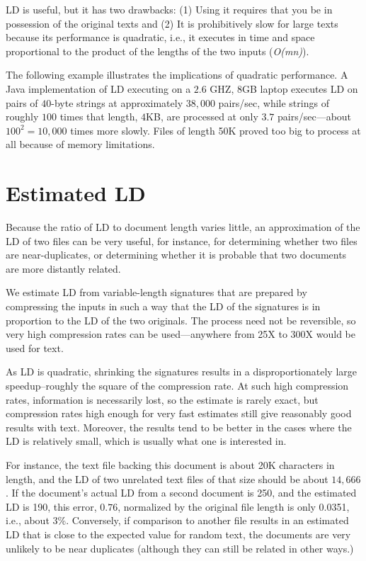 \documentclass[html]{article}    %
\begin{document}
LD is useful, but it has two drawbacks: 
(1) Using it requires that you be in possession of the original texts and 
(2) It is prohibitively slow for large texts because its performance is quadratic, i.e., it executes in 
time and space proportional to the product of the lengths of the two inputs ({\em O(mn)}).

The following example illustrates the implications of quadratic performance. 
A Java implementation of LD executing on a $2.6$ GHZ, 8GB laptop executes LD on pairs of $40$-byte strings at approximately 
$38,000$ pairs/sec, while strings of roughly $100$ times that length, $4$KB, are processed at only $3.7$ pairs/sec---about 
$100^{2}=10,000$ times more slowly. 
Files of length 50K proved too big to process at all because of memory limitations. 

\section{Estimated LD} 

Because the ratio of LD to document length varies little, an approximation of the LD of two files can be 
very useful, for instance, for determining whether two files are near-duplicates, or determining whether it is probable
that two documents are more distantly related. 

We estimate LD from variable-length signatures that are prepared by compressing the inputs in such a way that the LD of the 
signatures is in proportion to the LD of the two originals.  
The process need not be reversible, so very high compression rates can be used---anywhere from 25X to 300X 
would be used for text. 

As LD is quadratic, shrinking the signatures results in a disproportionately large speedup--roughly the square of the 
compression rate. 
At such high compression rates, information is necessarily lost, so the estimate is rarely exact, but compression rates 
high enough for very fast estimates still give reasonably good results with text. 
Moreover, the results tend to be better in the cases where the LD is relatively small, which is usually what one is interested in.

For instance, the text file backing this document is about 20K characters in length, and
the LD of two unrelated text files of that size should be about $14,666$. 
If the document's actual LD from a second document is 250, and the estimated LD is 190, 
this error, $0.76$, normalized by the original file length is only 0.0351, i.e., about 3\%.
Conversely, if comparison to another file results in an estimated LD that is close to the expected value for random 
text, the documents are very unlikely to be near duplicates (although they can still be related in other ways.)
\end{document}
